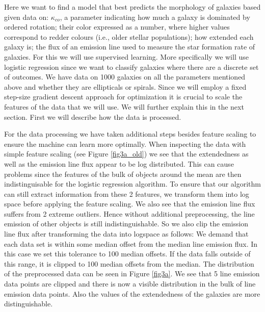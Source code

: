 \documentclass{article}
\begin{document}
Here we want to find a model that best predicts the morphology of galaxies based 
given data on: $\kappa_{co}$, a parameter indicating how much a galaxy is dominated by ordered rotation; 
their color expressed as a number, where higher values correspond to redder colours (i.e., older stellar populations); 
how extended each galaxy is; the flux of an emission line used to measure the star formation rate of galaxies.
For this we will use supervised learning. More specifically we will use logistic regression
since we want to classify galaxies where there are a discrete set of outcomes. 
We have data on 1000 galaxies on all the parameters mentioned above and whether
they are ellipticals or spirals.
Since we will employ a fixed step-size gradient descent approach for optimization 
it is crucial to scale the features of the data that we will use. We will further 
explain this in the next section. First we will describe how the data is processed.

For the data processing we have taken additional steps besides feature scaling to ensure 
the machine can learn more optimally. When inspecting the data with 
simple feature scaling (see Figure \ref{fig3a_old}) we see that 
the extendedness as well as the emission line flux appear to be log distributed. 
This can cause problems since the features of the bulk of objects around the mean 
are then indistinguisable for the logistic regression algorithm. 
To ensure that our algorithm can still extract information from these 2 features, we 
transform them into log space before applying the feature scaling.
We also see that the emission line flux suffers from 2 extreme outliers. 
Hence without additional preprocessing, the line emission of other objects is still indistinguishable.
So we also clip the emission line flux after transforming the data into logspace as follows:
We demand that each data set is within some median offset from the median line emission flux.
In this case we set this tolerance to 100 median offsets. If the data falls outside of this range, 
it is clipped to 100 median offsets from the median. The distribution of the preprocessed 
data can be seen in Figure \ref{fig3a}. We see that 5 line emission data points are clipped 
and there is now a visible distribution in the bulk of line emission data points. 
Also the values of the extendedness of the galaxies are more distinguishable.
\end{document}
